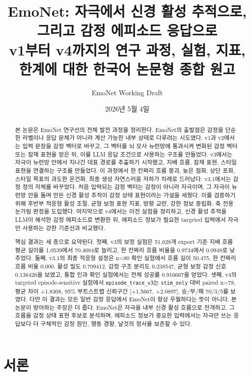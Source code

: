 \documentclass[11pt,a4paper]{article}
\title{\textbf{EmoNet: 자극에서 신경 활성 추적으로, 그리고 감정 에피소드 응답으로}\\
\large v1부터 v4까지의 연구 과정, 실험, 지표, 한계에 대한 한국어 논문형 종합 원고}
\author{EmoNet Working Draft}
\date{2026년 5월 4일}
\newcommand{\eng}[1]{\texttt{#1}}
\begin{document}
\maketitle

\begin{abstract}
본 논문은 EmoNet 연구선의 전체 발전 과정을 정리한다. EmoNet의 출발점은 감정을 단순한 라벨이나 응답 문체가 아니라 계산 가능한 내부 상태로 다루려는 시도였다. v1과 v2에서는 입력 문장을 감정 벡터로 바꾸고, 그 벡터를 뇌 모사 뉴런망에 통과시켜 변화된 감정 벡터 또는 잠재 표현을 얻은 뒤, 이를 LLM 응답 조건으로 사용하는 구조를 만들었다. v3에서는 자극이 뉴런망 안에서 지나간 대표 경로를 추출하기 시작했고, 지배 흐름, 잠재 표현, 스타일 표현을 연결하는 구조를 만들었다. 이 과정에서 한 칸짜리 흐름 붕괴, 늦은 점화, 상단 포화, 스타일 목표의 과도한 온건화, 최종 생성 자연스러움 저하가 차례로 드러났다. v3.1에서는 감정 정의 자체를 바꾸었다. 처음 입력되는 감정 벡터는 감정이 아니라 자극이며, 그 자극이 뉴런망 안을 돌며 만든 신경 활성 추적이 감정 상태 표현이라는 가설을 세웠다. 이를 검증하기 위해 후반부 적응형 활성 조절, 균형 보정 표현 지표, 방향 교란, 강한 정보 중립화, 축 전용 눈가림 판정을 도입했다. 마지막으로 v4에서는 이전 실험을 정리하고, 신경 활성 추적을 LLM이 해석한 감정 에피소드로 변환한 뒤, 에피소드 정보가 필요한 targeted 입력에서 자극만 사용하는 강한 기준선과 비교했다.

핵심 결과는 세 층으로 요약된다. 첫째, v3의 보정 실험은 51,628개 export 기준 지배 흐름 평균 길이를 1.0539에서 70.4684로 늘리고, 한 칸짜리 흐름 비율을 0.9734에서 0.0948로 낮추었다. 둘째, v3.1의 최종 적응형 설정은 n=80 확인 실험에서 흐름 길이 50.475, 한 칸짜리 흐름 비율 0.000, 활성 밀도 0.709412, 감정 구조 분리도 0.238547, 균형 보정 감정 신호 0.136426을 보였고, 통합 인과 확인 실험에서는 전체 성공률 0.916667을 얻었다. 셋째, v4의 targeted episode-sensitive 실험에서 \eng{episode\_trace\_v3}는 \eng{stim\_only} 대비 paired n=78, 평균 차이 +1.8308, 95\% 부트스트랩 신뢰구간 [+1.5667, +2.0897], 승/무/패 70/3/5를 보였다. 다만 이 결과는 모든 일반 감정 응답에서 EmoNet이 항상 우월하다는 뜻이 아니다. 본 논문이 방어하는 주장은 더 좁다. EmoNet은 자극을 내부 신경 활성 흐름으로 전개하고, 그 흐름을 감정 상태 표현 후보로 분석하며, 에피소드 정보가 중요한 입력에서는 자극만 쓰는 응답보다 더 구체적인 감정 원인, 행동 경향, 날것의 정서를 보존할 수 있다.
\end{abstract}

\tableofcontents
\newpage

\section{서론}
\end{document}

